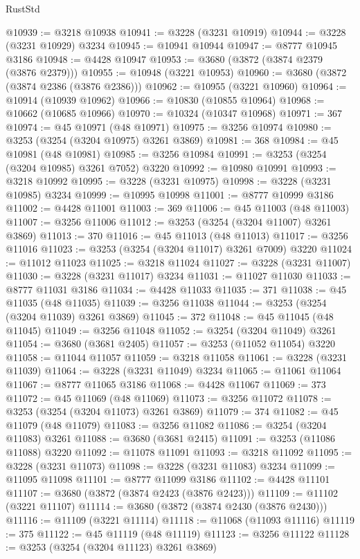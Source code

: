 \begin{lexlean}{RustStd}
\begin{coremodule}
{\begin{coremodule}
{{{{{{{{{{{{{{{{{{{{{{{{{{{{{{{{{{{{{@10939 := @3218 @10938
@10941 := @3228 (@3231 @10919)
@10944 := @3228 (@3231 @10929) @3234
@10945 := @10941 @10944
@10947 := @8777 @10945 @3186
@10948 := @4428 @10947
@10953 := @3680 (@3872 (@3874 @2379 (@3876 @2379)))
@10955 := @10948 (@3221 @10953)
@10960 := @3680 (@3872 (@3874 @2386 (@3876 @2386)))
@10962 := @10955 (@3221 @10960)
@10964 := @10914 (@10939 @10962)
@10966 := @10830 (@10855 @10964)
@10968 := @10662 (@10685 @10966)
@10970 := @10324 (@10347 @10968)
@10971 := 367
@10974 := @45 @10971 (@48 @10971)
@10975 := @3256 @10974
@10980 := @3253 (@3254 (@3204 @10975) @3261 @3869)
@10981 := 368
@10984 := @45 @10981 (@48 @10981)
@10985 := @3256 @10984
@10991 := @3253 (@3254 (@3204 @10985) @3261 @7052) @3220
@10992 := @10980 @10991
@10993 := @3218 @10992
@10995 := @3228 (@3231 @10975)
@10998 := @3228 (@3231 @10985) @3234
@10999 := @10995 @10998
@11001 := @8777 @10999 @3186
@11002 := @4428 @11001
@11003 := 369
@11006 := @45 @11003 (@48 @11003)
@11007 := @3256 @11006
@11012 := @3253 (@3254 (@3204 @11007) @3261 @3869)
@11013 := 370
@11016 := @45 @11013 (@48 @11013)
@11017 := @3256 @11016
@11023 := @3253 (@3254 (@3204 @11017) @3261 @7009) @3220
@11024 := @11012 @11023
@11025 := @3218 @11024
@11027 := @3228 (@3231 @11007)
@11030 := @3228 (@3231 @11017) @3234
@11031 := @11027 @11030
@11033 := @8777 @11031 @3186
@11034 := @4428 @11033
@11035 := 371
@11038 := @45 @11035 (@48 @11035)
@11039 := @3256 @11038
@11044 := @3253 (@3254 (@3204 @11039) @3261 @3869)
@11045 := 372
@11048 := @45 @11045 (@48 @11045)
@11049 := @3256 @11048
@11052 := @3254 (@3204 @11049) @3261
@11054 := @3680 (@3681 @2405)
@11057 := @3253 (@11052 @11054) @3220
@11058 := @11044 @11057
@11059 := @3218 @11058
@11061 := @3228 (@3231 @11039)
@11064 := @3228 (@3231 @11049) @3234
@11065 := @11061 @11064
@11067 := @8777 @11065 @3186
@11068 := @4428 @11067
@11069 := 373
@11072 := @45 @11069 (@48 @11069)
@11073 := @3256 @11072
@11078 := @3253 (@3254 (@3204 @11073) @3261 @3869)
@11079 := 374
@11082 := @45 @11079 (@48 @11079)
@11083 := @3256 @11082
@11086 := @3254 (@3204 @11083) @3261
@11088 := @3680 (@3681 @2415)
@11091 := @3253 (@11086 @11088) @3220
@11092 := @11078 @11091
@11093 := @3218 @11092
@11095 := @3228 (@3231 @11073)
@11098 := @3228 (@3231 @11083) @3234
@11099 := @11095 @11098
@11101 := @8777 @11099 @3186
@11102 := @4428 @11101
@11107 := @3680 (@3872 (@3874 @2423 (@3876 @2423)))
@11109 := @11102 (@3221 @11107)
@11114 := @3680 (@3872 (@3874 @2430 (@3876 @2430)))
@11116 := @11109 (@3221 @11114)
@11118 := @11068 (@11093 @11116)
@11119 := 375
@11122 := @45 @11119 (@48 @11119)
@11123 := @3256 @11122
@11128 := @3253 (@3254 (@3204 @11123) @3261 @3869)
}}}}}}}}}}}}}}}}}}}}}}}}}}}}}}}}}}}}}
\end{coremodule}}
\end{coremodule}
\end{lexlean}
